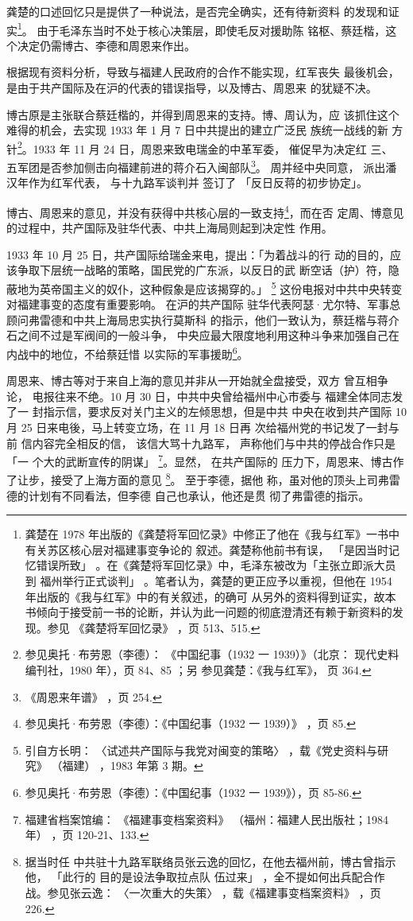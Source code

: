 龚楚的口述回忆只是提供了一种说法，是否完全确实，还有待新资料
的发现和证实\footnote{龚楚在 1978 年出版的《龚楚将军回忆录》中修正了他在《我与红军》一书中有关苏区核心层对福建事变争论的
叙述。龚楚称他前书有误，
「是因当时记忆错误所致」
。在《龚楚将军回忆录》中，毛泽东被改为「主张立即派大员到
福州举行正式谈判」
。笔者认为，龚楚的更正应予以重视，但他在 1954 年出版的《我与红军》中的有关叙述，的确可
从另外的资料得到证实，故本书倾向于接受前一书的论断，并认为此一问题的彻底澄清还有赖于新资料的发现。参见
《龚楚将军回忆录》
，页 513、515. }。 由于毛泽东当时不处于核心决策层，即使毛反对援助陈
铭枢、蔡廷楷，这个决定仍需博古、李德和周恩来作出。

根据现有资料分析，导致与福建人民政府的合作不能实现，红军丧失
最後机会，是由于共产国际及在沪的代表的错误指导，以及博古、周恩来
的犹疑不决。

博古原是主张联合蔡廷楷的，并得到周恩来的支持。博、周认为，应 该抓住这个
难得的机会，去实现 1933 年 1 月 7 日中共提出的建立广泛民 族统一战线的新
方针\footnote{参见奥托·布劳恩（李德）：
《中国纪事（1932 一 1939）》（北京：
现代史料编刊社，1980 年），页 84、85 ；另 参见龚楚：《我与红军》，
页 364.}。1933 年 11 月 24 日，周恩来致电瑞金的中革军委， 催促早为决定红
三、 五军团是否参加侧击向福建前进的蒋介石入闽部队\footnote{《周恩来年谱》
，页 254.}。 周并经中央同意， 派出潘汉年作为红军代表， 与十九路军谈判并
签订了 「反日反蒋的初步协定」。

博古、周恩来的意见，并没有获得中共核心层的一致支持\footnote{参见奥托·布劳恩（李德）：《中国纪事（1932 一 1939）》
，页 85.}，而在否
定周、博意见的过程中，共产国际及驻华代表、中共上海局则起到决定性
作用。

1933 年 10 月 25 日，共产国际给瑞金来电，提出：「为着战斗的行
动的目的，应该争取下层统一战略的策略，国民党的广东派，以反日的武
断空话（护）符，隐蔽地为英帝国主义的奴仆，这种假象是应该揭穿的。」
\footnote{引自方长明：
〈试述共产国际与我党对闽变的策略〉
，载《党史资料与研究》
（福建）
，1983 年第 3 期。}
这份电报对中共中央转变对福建事变的态度有重要影响。
在沪的共产国际
驻华代表阿瑟·尤尔特、军事总顾问弗雷德和中共上海局忠实执行莫斯科
的指示，他们一致认为，蔡廷楷与蒋介石之间不过是军阀间的一般斗争，
中央应最大限度地利用这种斗争来加强自己在内战中的地位，不给蔡廷惜
以实际的军事援助\footnote{ 参见奥托·布劳恩（李德）：《中国纪事（1932 一 1939》），页 85-86.}。

周恩来、博古等对于来自上海的意见并非从一开始就全盘接受，双方 曾互相争论，
电报往来不绝。10 月 30 日，中共中央曾给福州中心市委与 福建全体同志发了一
封指示信，要求反对关门主义的左倾思想，但是中共 中央在收到共产国际 10 月
25 日来电後，马上转变立场，在 11 月 18 日再 次给福州党的书记发了一封与前
信内容完全相反的信， 该信大骂十九路军， 声称他们与中共的停战合作只是「一
个大的武断宣传的阴谋」 \footnote{福建省档案馆编： 《福建事变档案资料》
（福州：福建人民出版社；1984 年） ，页 120-21、133.}。显然， 在共产国际的
压力下，周恩来、博古作了让步，接受了上海方面的意见 \footnote{据当时任
中共驻十九路军联络员张云逸的回忆，在他去福州前，博古曾指示他， 「此行的
目的是设法争取拉点队 伍过来」 ，全不提如何出兵配合作战。参见张云逸：
〈一次重大的失策〉 ，载《福建事变档案资料》 ，页 226.  }。 至于李德，据他
称，虽对他的顶头上司弗雷德的计划有不同看法，但李德 自己也承认，他还是贯
彻了弗雷德的指示。

